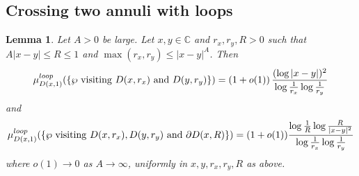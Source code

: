 \documentclass[11pt]{article}
\newtheorem{lemma}[theorem]{Lemma}
\theoremstyle{remark}
\newcommand{\C}{\mathbb{C}}
\def \loopmeasure{\mu^{\rm loop}}
\numberwithin{equation}{section}
\begin{document}
\subsection{Crossing two annuli with loops}\label{SS:two_annuli}


\begin{lemma}\label{L:two_annuli}
Let $A>0$ be large.
Let $x,y \in \C$ and $r_x, r_y,R >0$ such that $A |x-y| \leq R \leq 1$ and $\max(r_x,r_y) \leq |x-y|^A$. Then
\begin{equation}
\label{E:L_polar00}
\loopmeasure_{D(x,1)} ( \{ \wp \mathrm{~visiting~} D(x,r_x) \mathrm{~and~} D(y,r_y) \} )
= \left( 1 + o(1) \right) \frac{(\log |x-y|)^2}{\log \frac{1}{r_x} \log \frac{1}{r_y}}
\end{equation}
and
\begin{align}
\label{E:L_polar0}
\loopmeasure_{D(x,1)} ( \{ \wp \mathrm{~visiting~} D(x,r_x), D(y,r_y) \mathrm{~and~} \partial D(x,R) \} )
= (1+o(1)) \frac{\log \frac{1}{R} \log \frac{R}{|x-y|^2}}{\log \frac{1}{r_x} \log \frac{1}{r_y}}
\end{align}
where $o(1) \to 0$ as $A \to \infty$, uniformly in $x,y, r_x, r_y, R$ as above.
\end{lemma}
\end{document}
